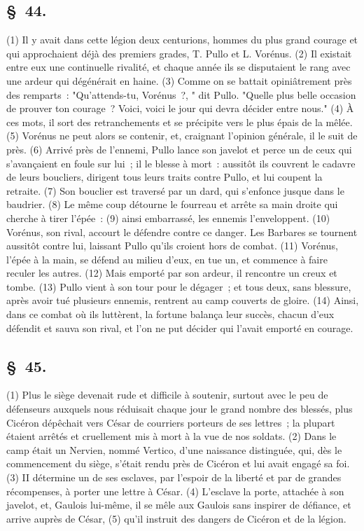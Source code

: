 \documentclass[french,twoside]{book} %
\begin{document}
\subsection[{§ 44.}]{ \textsc{§ 44.} }
\noindent (1) Il y avait dans cette légion deux centurions, hommes du plus grand courage et qui approchaient déjà des premiers grades, T. Pullo et L. Vorénus. (2) Il existait entre eux une continuelle rivalité, et chaque année ils se disputaient le rang avec une ardeur qui dégénérait en haine. (3) Comme on se battait opiniâtrement près des remparts : "Qu'attends-tu, Vorénus ?, " dit Pullo. "Quelle plus belle occasion de prouver ton courage ? Voici, voici le jour qui devra décider entre nous." (4) À ces mots, il sort des retranchements et se précipite vers le plus épais de la mêlée. (5) Vorénus ne peut alors se contenir, et, craignant l’opinion générale, il le suit de près. (6) Arrivé près de l’ennemi, Pullo lance son javelot et perce un de ceux qui s’avançaient en foule sur lui ; il le blesse à mort : aussitôt ils couvrent le cadavre de leurs boucliers, dirigent tous leurs traits contre Pullo, et lui coupent la retraite. (7) Son bouclier est traversé par un dard, qui s’enfonce jusque dans le baudrier. (8) Le même coup détourne le fourreau et arrête sa main droite qui cherche à tirer l’épée : (9) ainsi embarrassé, les ennemis l’enveloppent. (10) Vorénus, son rival, accourt le défendre contre ce danger. Les Barbares se tournent aussitôt contre lui, laissant Pullo qu’ils croient hors de combat. (11) Vorénus, l’épée à la main, se défend au milieu d’eux, en tue un, et commence à faire reculer les autres. (12) Mais emporté par son ardeur, il rencontre un creux et tombe. (13) Pullo vient à son tour pour le dégager ; et tous deux, sans blessure, après avoir tué plusieurs ennemis, rentrent au camp couverts de gloire. (14) Ainsi, dans ce combat où ils luttèrent, la fortune balança leur succès, chacun d’eux défendit et sauva son rival, et l’on ne put décider qui l’avait emporté en courage.
\subsection[{§ 45.}]{ \textsc{§ 45.} }
\noindent (1) Plus le siège devenait rude et difficile à soutenir, surtout avec le peu de défenseurs auxquels nous réduisait chaque jour le grand nombre des blessés, plus Cicéron dépêchait vers César de courriers porteurs de ses lettres ; la plupart étaient arrêtés et cruellement mis à mort à la vue de nos soldats. (2) Dans le camp était un Nervien, nommé Vertico, d’une naissance distinguée, qui, dès le commencement du siège, s’était rendu près de Cicéron et lui avait engagé sa foi. (3) II détermine un de ses esclaves, par l’espoir de la liberté et par de grandes récompenses, à porter une lettre à César. (4) L'esclave la porte, attachée à son javelot, et, Gaulois lui-même, il se mêle aux Gaulois sans inspirer de défiance, et arrive auprès de César, (5) qu’il instruit des dangers de Cicéron et de la légion.
\end{document}
